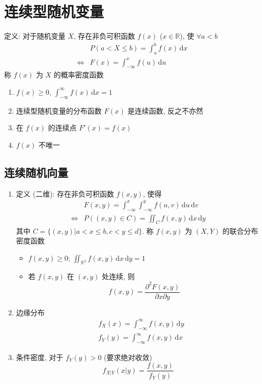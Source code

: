 \documentclass[11pt,a4paper,twocolumn]{article} %
\numberwithin{equation}{section} %
\newcommand{\dif}{\,\mathrm d}
\begin{document}
\section{连续型随机变量} %
\label{sec:continuous}
定义: 对于随机变量 $X$, 存在非负可积函数 $f(x)$ ($x\in\mathbb R$), 
使 $\forall a<b$
\begin{align}
	& P(a < X \le b) = \int_a^b f(x)\dif x \\
	\Leftrightarrow & F(x) = \int_{-\infty}^x f(u)\dif u
\end{align}
称 $f(x)$ 为 $X$ 的概率密度函数
\begin{enumerate}
	\item $f(x) \ge 0$, $\int_{-\infty}^\infty f(x)\dif x = 1$
	\item 连续型随机变量的分布函数 $F(x)$ 是连续函数, 反之不亦然
	\item 在 $f(x)$ 的连续点 $F'(x) = f(x)$
	\item $f(x)$ 不唯一
\end{enumerate}
\subsection{连续随机向量} %
\label{sub:multi_dim_conti}
\begin{enumerate}
	\item 定义 (二维): 存在非负可积函数 $f(x,y)$, 使得
	\begin{align}
		&F(x,y) = \int_{-\infty}^x\int_{-\infty}^y f(u, v)\dif u\dif v\\
		\Leftrightarrow & P((x,y)\in C) = \iint_C f(x,y)\dif x\dif y
	\end{align}
	其中 $C = \{(x,y)|a<x\le b, c<y\le d\}$. 
	称 $f(x,y)$ 为 $(X,Y)$ 的联合分布密度函数
	\begin{itemize}
		\item $f(x,y)\ge 0$; $\iint_{\mathbb R^2} f(x,y)\dif x\dif y = 1$
		\item 若 $f(x,y)$ 在 $(x,y)$ 处连续, 则
		\begin{equation}
			f(x, y) = \frac{\partial^2 F(x,y)}{\partial x\partial y}
		\end{equation}
	\end{itemize}
	\item 边缘分布
	\begin{align}
		&f_X(x) = \int_{-\infty}^\infty f(x, y) \dif y\\
		&f_Y(y) = \int_{-\infty}^\infty f(x, y) \dif x
	\end{align}
	\item 条件密度, 对于 $f_Y(y) > 0$ (要求绝对收敛)
	\begin{equation}
		f_{X|Y}(x|y) = \frac{f(x,y)}{f_Y(y)}
	\end{equation}
\end{enumerate}
\end{document}

